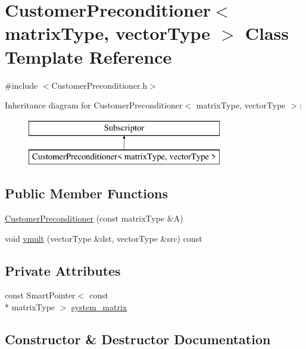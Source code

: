 \section{Customer\-Preconditioner$<$ matrix\-Type, vector\-Type $>$ Class Template Reference}
\label{class_customer_preconditioner}


{\ttfamily \#include $<$Customer\-Preconditioner.\-h$>$}

Inheritance diagram for Customer\-Preconditioner$<$ matrix\-Type, vector\-Type $>$\-:\begin{figure}[H]
\begin{center}
\leavevmode
\includegraphics[height=2.000000cm]{class_customer_preconditioner}
\end{center}
\end{figure}
\subsection*{Public Member Functions}
\begin{DoxyCompactItemize}
\item 
\hyperlink{class_customer_preconditioner_a3603795be2fcda83add4d39b5905fbcf}{Customer\-Preconditioner} (const matrix\-Type \&A)
\item 
void \hyperlink{class_customer_preconditioner_a37f1a485f92afe8af3ed39bca0996af6}{vmult} (vector\-Type \&dst, vector\-Type \&src) const 
\end{DoxyCompactItemize}
\subsection*{Private Attributes}
\begin{DoxyCompactItemize}
\item 
const Smart\-Pointer$<$ const \\*
matrix\-Type $>$ \hyperlink{class_customer_preconditioner_a565a77476d06a1a0c5eaeb48b8fa3736}{system\-\_\-matrix}
\end{DoxyCompactItemize}


\subsection{Constructor \& Destructor Documentation}

